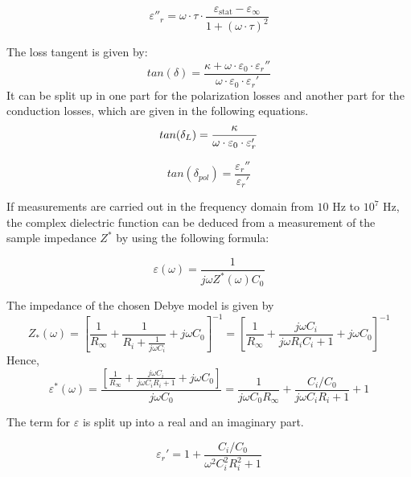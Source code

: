 \begin{equation}
\varepsilon''_r = \omega \cdot \tau \cdot \frac{\varepsilon_{\textrm{stat}}-\varepsilon_{\infty}}{1+(\omega \cdot \tau )^2}
\end{equation}

The loss tangent  is given by:
\begin{equation}
tan (\delta) = \frac{\kappa + \omega \cdot \varepsilon_0 \cdot \varepsilon _r ''}{\omega \cdot \varepsilon_0 \cdot \varepsilon _r '}
\end{equation}
It can be split up in one part for the polarization losses and another part for the conduction losses, which are given in the following equations. 
\begin{equation}
tan (\delta_{L}) = \frac{\kappa}{\omega \cdot \varepsilon_0 \cdot \varepsilon_r'} \newline
\end{equation}

\begin{equation}
tan (\delta_{pol}) = \frac {\varepsilon_r'' } {\varepsilon_r'}
\end{equation}


If measurements are carried out in the frequency domain from $10$ Hz to $10^{7}$ Hz, the complex dielectric function can be deduced from a measurement of the sample impedance $Z^*$ by using the following formula:

\begin{equation}
\varepsilon(\omega) = \frac{1}{j \omega  Z^*(\omega) C_0}
\end{equation}

The impedance of the chosen Debye model is given by 
\begin{equation}
Z_*(\omega)=[\frac{1}{R_\infty}+\frac{1}{R_i+\frac{1}{j \omega C_i}}+j \omega C_0]^{-1} = [\frac{1}{R_\infty}+\frac{j \omega C_i}{j\omega R_i  C_i+1}+j \omega C_0]^{-1}
\end{equation}
Hence,
\begin{equation}
\varepsilon^*(\omega)= \frac{[\frac{1}{R_\infty}+\frac{j \omega C_i}{j\omega C_i R_i  +1}+j \omega C_0]}{j \omega C_0} = \frac{1}{j \omega C_0 R_\infty}+ \frac{C_i/C_0}{j\omega C_i R_i  +1}+1
\end{equation}

The term for $\varepsilon$ is split up into a real and an imaginary part. 

\begin{equation}
\varepsilon_r' = 1+ \frac{C_i/C_0}{\omega^2 C_i^2 R_i^2 +1}
\end{equation}

